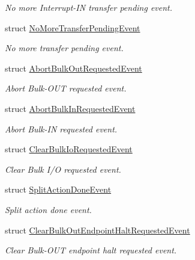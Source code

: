 \begin{DoxyCompactItemize}
\begin{DoxyCompactList}\small\item\em No more Interrupt-\/\-I\-N transfer pending event. \end{DoxyCompactList}\item 
struct \hyperlink{structmdt_usbtmc_transfer_handler_state_machine_1_1_no_more_transfer_pending_event}{No\-More\-Transfer\-Pending\-Event}
\begin{DoxyCompactList}\small\item\em No more transfer pending event. \end{DoxyCompactList}\item 
struct \hyperlink{structmdt_usbtmc_transfer_handler_state_machine_1_1_abort_bulk_out_requested_event}{Abort\-Bulk\-Out\-Requested\-Event}
\begin{DoxyCompactList}\small\item\em Abort Bulk-\/\-O\-U\-T requested event. \end{DoxyCompactList}\item 
struct \hyperlink{structmdt_usbtmc_transfer_handler_state_machine_1_1_abort_bulk_in_requested_event}{Abort\-Bulk\-In\-Requested\-Event}
\begin{DoxyCompactList}\small\item\em Abort Bulk-\/\-I\-N requested event. \end{DoxyCompactList}\item 
struct \hyperlink{structmdt_usbtmc_transfer_handler_state_machine_1_1_clear_bulk_io_requested_event}{Clear\-Bulk\-Io\-Requested\-Event}
\begin{DoxyCompactList}\small\item\em Clear Bulk I/\-O requested event. \end{DoxyCompactList}\item 
struct \hyperlink{structmdt_usbtmc_transfer_handler_state_machine_1_1_split_action_done_event}{Split\-Action\-Done\-Event}
\begin{DoxyCompactList}\small\item\em Split action done event. \end{DoxyCompactList}\item 
struct \hyperlink{structmdt_usbtmc_transfer_handler_state_machine_1_1_clear_bulk_out_endpoint_halt_requested_event}{Clear\-Bulk\-Out\-Endpoint\-Halt\-Requested\-Event}
\begin{DoxyCompactList}\small\item\em Clear Bulk-\/\-O\-U\-T endpoint halt requested event. \end{DoxyCompactList}\item 

\end{DoxyCompactItemize}

